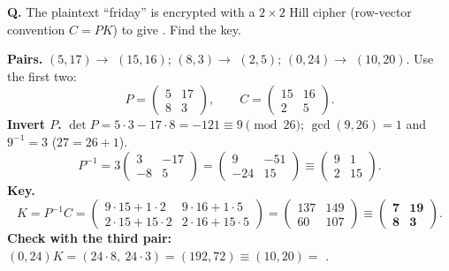 \begin{worked}
\textbf{Q.} The plaintext ``friday'' is encrypted with a $2 \times 2$ Hill cipher (row-vector convention $C = PK$) to give . Find the key.

\textbf{Pairs.}  $(5, 17) \to$  $(15, 16)$; \; $(8, 3) \to$  $(2, 5)$; \; $(0, 24) \to$  $(10, 20)$. Use the first two:
\[
P = \begin{pmatrix} 5 & 17\\ 8 & 3\end{pmatrix}, \qquad C = \begin{pmatrix} 15 & 16\\ 2 & 5\end{pmatrix}.
\]
\textbf{Invert $P$.} $\det P = 5 \cdot 3 - 17 \cdot 8 = -121 \equiv 9 \pmod{26}$; $\gcd(9, 26) = 1$ and $9^{-1} = 3$ ($27 = 26 + 1$).
\[
P^{-1} = 3 \begin{pmatrix} 3 & -17\\ -8 & 5\end{pmatrix} = \begin{pmatrix} 9 & -51\\ -24 & 15\end{pmatrix} \equiv \begin{pmatrix} 9 & 1\\ 2 & 15\end{pmatrix}.
\]
\textbf{Key.}
\[
K = P^{-1}C = \begin{pmatrix} 9 \cdot 15 + 1 \cdot 2 & 9 \cdot 16 + 1 \cdot 5\\ 2 \cdot 15 + 15 \cdot 2 & 2 \cdot 16 + 15 \cdot 5\end{pmatrix} = \begin{pmatrix} 137 & 149\\ 60 & 107\end{pmatrix} \equiv \mathbf{\begin{pmatrix} 7 & 19\\ 8 & 3\end{pmatrix}}.
\]
\textbf{Check with the third pair:} $(0, 24) K = (24 \cdot 8,\ 24 \cdot 3) = (192, 72) \equiv (10, 20) = $  \checkmark.
\end{worked}


